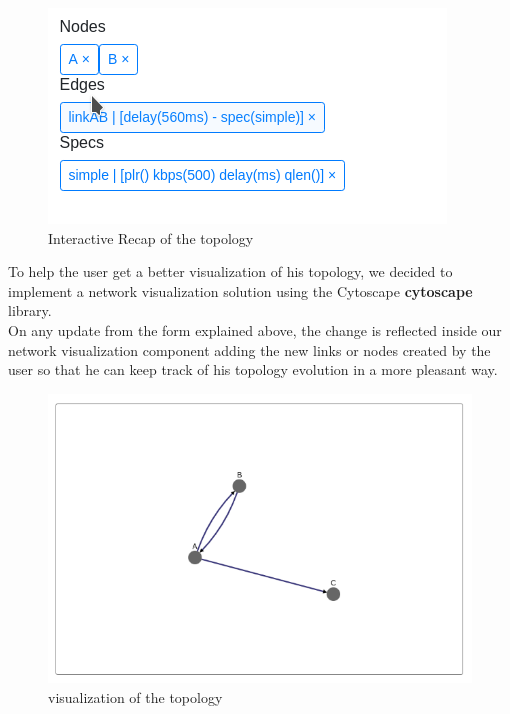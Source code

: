 \documentclass{eplmastersthesis}
\begin{document}
          \begin{figure}[H]
            \centering
            \includegraphics[scale=0.6]{figures/recap_topology.png}
            \caption{\label{recap_topology} Interactive Recap of the topology}
          \end{figure}

          To help the user get a better visualization of his topology, we
          decided to implement a network visualization solution using the
          Cytoscape \textbf{cytoscape} library.\\
          On any update from the form explained above, the change is reflected
          inside our network visualization component adding the new links or
          nodes created by the user so that he can keep track of his topology
          evolution in a more pleasant way.\\

          \begin{figure}[H]
            \centering
            \includegraphics[scale=0.6]{figures/visual_topology.png}
            \caption{\label{visual_topology} visualization of the topology}
          \end{figure}
\end{document}
